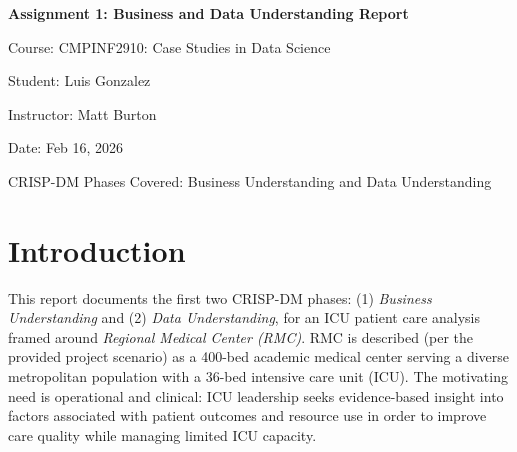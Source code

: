 \documentclass[12pt]{article}
\newcommand{\ProjectTitle}{Assignment 1: Business and Data Understanding Report}
\newcommand{\CourseName}{CMPINF2910: Case Studies in Data Science}
\newcommand{\StudentName}{Luis Gonzalez}
\newcommand{\InstructorName}{Matt Burton}
\newcommand{\DueDate}{Feb 16, 2026}
\begin{document}
\begin{titlepage}
    \centering
    {\Large \textbf{\ProjectTitle}\par}
    \vspace{1.0cm}
    {\large Course: \CourseName\par}
    \vspace{0.3cm}
    {\large Student: \StudentName\par}
    \vspace{0.3cm}
    {\large Instructor: \InstructorName\par}
    \vspace{0.3cm}
    {\large Date: \DueDate\par}
    \vfill
    {\small CRISP-DM Phases Covered: Business Understanding and Data Understanding}
\end{titlepage}

\tableofcontents
\newpage

\section*{Introduction}
\label{sec:intro}

%
%

This report documents the first two CRISP-DM phases: (1) \textit{Business Understanding} and (2) \textit{Data Understanding}, for an ICU patient care analysis framed around \textit{Regional Medical Center (RMC)}. RMC is described (per the provided project scenario) as a 400-bed academic medical center serving a diverse metropolitan population with a 36-bed intensive care unit (ICU). The motivating need is operational and clinical: ICU leadership seeks evidence-based insight into factors associated with patient outcomes and resource use in order to improve care quality while managing limited ICU capacity.
\end{document}

